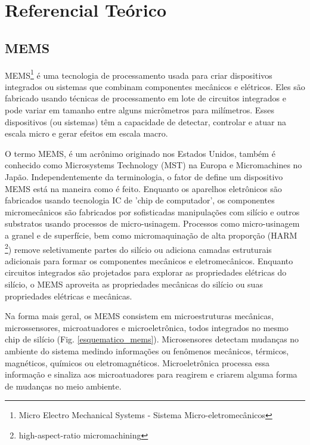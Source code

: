 
\chapter[Referencial Teórico]{Referencial Teórico}

\section{MEMS}

MEMS\footnote{Micro Electro Mechanical Systems - Sistema Micro-eletromecânicos}  é uma tecnologia de processamento usada para criar dispositivos integrados ou sistemas que combinam componentes mecânicos e elétricos. Eles são fabricado usando técnicas de processamento em lote de circuitos integrados e pode variar em tamanho entre alguns micrômetros para milímetros. Esses dispositivos (ou sistemas) têm a capacidade de detectar, controlar e atuar na escala micro e gerar efeitos em escala macro\cite{prime2002}. 

O termo MEMS, é um acrônimo originado nos Estados Unidos, também é conhecido como Microsystems Technology (MST) na Europa e Micromachines no Japão. Independentemente da terminologia, o fator de define um dispositivo MEMS está na maneira como é feito. Enquanto os aparelhos eletrônicos são fabricados usando tecnologia IC de 'chip de computador', os componentes micromecânicos são fabricados por sofisticadas manipulações com silício e outros substratos usando processos de micro-usinagem. Processos como micro-usinagem a granel e de superfície, bem como micromaquinação de alta proporção (HARM \footnote{high-aspect-ratio micromachining}) remove seletivamente partes do silício ou adiciona camadas estruturais adicionais para formar os componentes mecânicos e eletromecânicos. Enquanto circuitos integrados são projetados para explorar as propriedades elétricas do silício, o MEMS aproveita as propriedades mecânicas do silício ou suas propriedades elétricas e mecânicas\cite{prime2002}.

Na forma mais geral, os MEMS consistem em microestruturas mecânicas, microssensores, microatuadores e microeletrônica, todos integrados no mesmo chip de silício (Fig. \ref{esquematico_mems}). Microsensores detectam mudanças no ambiente do sistema medindo informações ou fenômenos mecânicos, térmicos, magnéticos, químicos ou eletromagnéticos. Microeletrônica processa essa informação e sinaliza aos microatuadores para reagirem e criarem alguma forma de mudanças no meio ambiente\cite{prime2002}.

